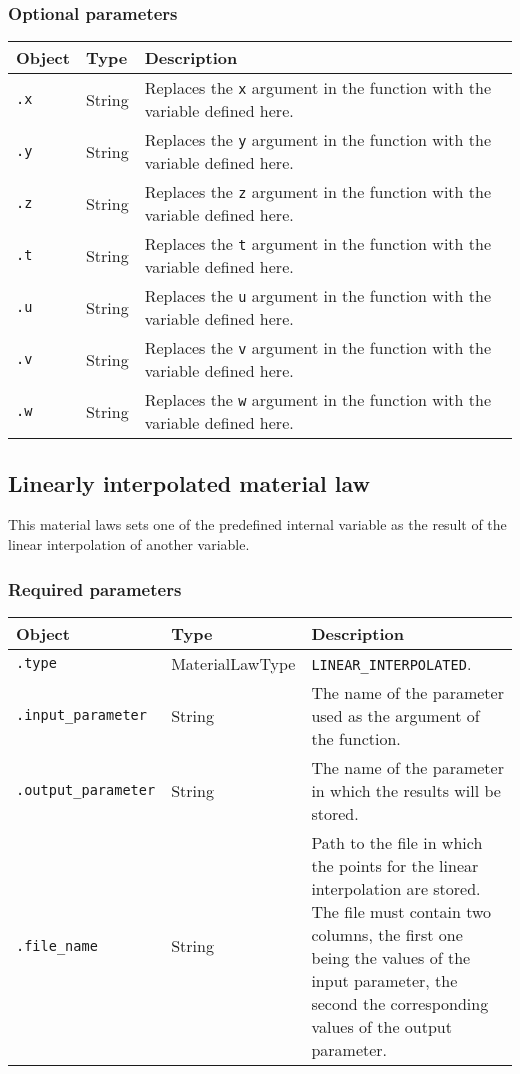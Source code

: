 \documentclass[10pt]{article}
\begin{document}
\subsubsection*{Optional parameters}

\begin{tabularx}{\textwidth}{llX}
\hline 
Object & Type & Description \\ 
\hline 
\verb+.x+ & String & Replaces the \verb+x+ argument in the function with the variable defined here. \\ 
\verb+.y+ & String & Replaces the \verb+y+ argument in the function with the variable defined here. \\ 
\verb+.z+ & String & Replaces the \verb+z+ argument in the function with the variable defined here. \\ 
\verb+.t+ & String & Replaces the \verb+t+ argument in the function with the variable defined here. \\ 
\verb+.u+ & String & Replaces the \verb+u+ argument in the function with the variable defined here. \\ 
\verb+.v+ & String & Replaces the \verb+v+ argument in the function with the variable defined here. \\ 
\verb+.w+ & String & Replaces the \verb+w+ argument in the function with the variable defined here. \\ 
\hline 
\end{tabularx}

\subsection{Linearly interpolated material law}

This material laws sets one of the predefined internal variable as the result of the linear interpolation of another variable.

\subsubsection*{Required parameters}

\begin{tabularx}{\textwidth}{llX}
\hline 
Object & Type & Description \\ 
\hline 
\verb+.type+ & MaterialLawType & \verb+LINEAR_INTERPOLATED+. \\ 
\verb+.input_parameter+ & String & The name of the parameter used as the argument of the function.\\
\verb+.output_parameter+ & String & The name of the parameter in which the results will be stored.\\
\verb+.file_name+ & String & Path to the file in which the points for the linear interpolation are stored. The file must contain two columns, the first one being the values of the input parameter, the second the corresponding values of the output parameter.\\
\hline 
\end{tabularx}
\end{document}
